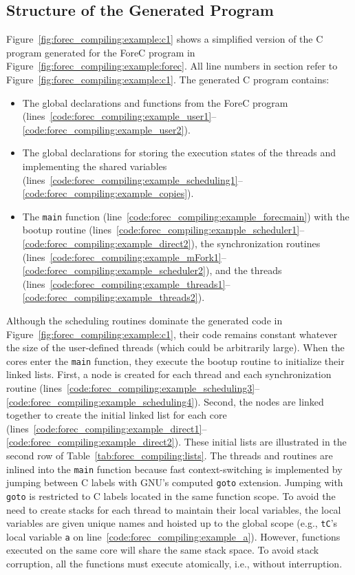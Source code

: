 \subsection{Structure of the Generated Program}
Figure~\ref{fig:forec_compiling:example:c1} 
shows a simplified version of the C program generated for the
ForeC program in Figure~\ref{fig:forec_compiling:example:forec}. 
All line numbers in section refer to Figure~\ref{fig:forec_compiling:example:c1}.
The generated C program contains:
\begin{itemize} 
	\item The global declarations and functions from the ForeC program
		  (lines~\ref{code:forec_compiling:example_user1}--\ref{code:forec_compiling:example_user2}).
	\item The global declarations for storing the execution states of the threads and implementing the shared variables 
		  (lines~\ref{code:forec_compiling:example_scheduling1}--\ref{code:forec_compiling:example_copies}).
	\item The \verb$main$ function (line~\ref{code:forec_compiling:example_forecmain})
		  with the bootup routine (lines~\ref{code:forec_compiling:example_scheduler1}--\ref{code:forec_compiling:example_direct2}),
		  the synchronization routines 
		  (lines~\ref{code:forec_compiling:example_mFork1}--\ref{code:forec_compiling:example_scheduler2}), 
		  and the threads (lines~\ref{code:forec_compiling:example_threads1}--\ref{code:forec_compiling:example_threads2}). 
\end{itemize}
Although the scheduling routines dominate the generated code 
in Figure~\ref{fig:forec_compiling:example:c1}, their code remains constant 
whatever the size of the user-defined threads (which could be arbitrarily large).
When the cores enter the \verb$main$ function, they execute
the bootup routine to initialize their linked lists. First, 
a node is created for each thread and each synchronization routine
(lines~\ref{code:forec_compiling:example_scheduling3}--\ref{code:forec_compiling:example_scheduling4}). 
Second, the nodes are linked together to create the initial
linked list for each core (lines~\ref{code:forec_compiling:example_direct1}--\ref{code:forec_compiling:example_direct2}).
These initial lists are illustrated in the second row of 
Table~\ref{tab:forec_compiling:lists}. The threads and 
routines are inlined into the \verb$main$ function because fast
context-switching is implemented by jumping between C labels
with GNU's computed \verb$goto$ extension. Jumping with \verb$goto$ 
is restricted to C labels located in the same function scope. To avoid the need to 
create stacks for each thread to maintain their local variables, 
the local variables are given unique names and hoisted up to the 
global scope (e.g., \verb$tC$'s local variable
\verb$a$ on line~\ref{code:forec_compiling:example_a}). 
However, functions executed on the same core will
share the same stack space. To avoid stack corruption, all the
functions must execute atomically, i.e., without interruption. 

